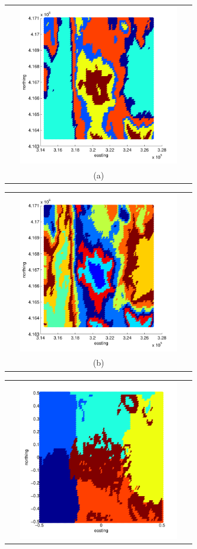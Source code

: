 \documentclass[12pt,letterpaper]{article}
\begin{document}
\begin{figure}[ht!]
  \begin{minipage}[b]{0.5\textwidth}
    \begin{tabular}{c}
      \includegraphics[width=8cm,height=7cm,keepaspectratio]{figs/Spectral1_old.pdf}\\
      (a)
    \end{tabular}
  \end{minipage}
  \begin{minipage}{0.5\textwidth}
    \begin{tabular}{c}
      \includegraphics[width=8cm,height=7cm,keepaspectratio]{figs/T30_K10.pdf}\\
      (b)
    \end{tabular}
  \end{minipage}
  \begin{minipage}[b]{0.5\textwidth}
    \begin{tabular}{c}
      \includegraphics[width=8cm,height=7cm,keepaspectratio]{figs/Spectral2.pdf}\\

\end{tabular}
\end{minipage}
\end{figure}
\end{document}
